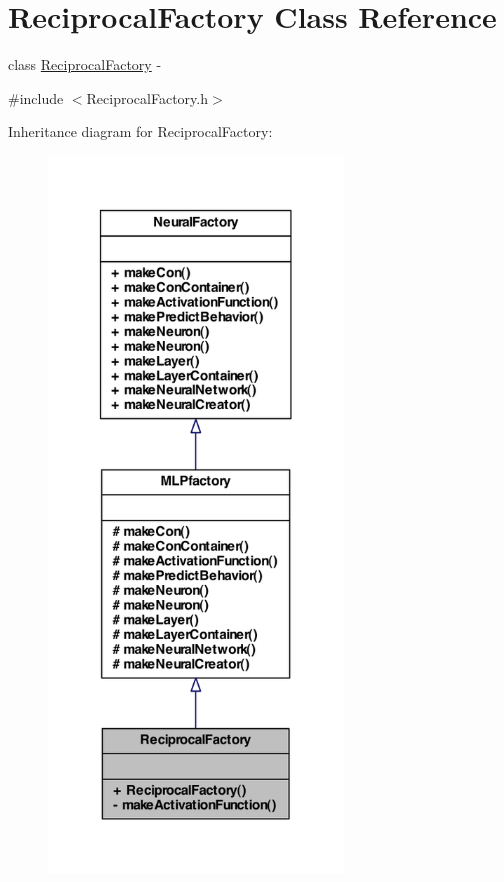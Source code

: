 \hypertarget{class_reciprocal_factory}{
\section{ReciprocalFactory Class Reference}
\label{class_reciprocal_factory}
}


class \hyperlink{class_reciprocal_factory}{ReciprocalFactory} -\/  




{\ttfamily \#include $<$ReciprocalFactory.h$>$}



Inheritance diagram for ReciprocalFactory:\nopagebreak
\begin{figure}[H]
\begin{center}
\leavevmode
\includegraphics[width=222pt]{class_reciprocal_factory__inherit__graph}
\end{center}
\end{figure}


